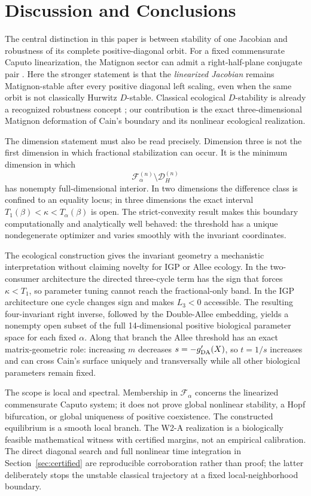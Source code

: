 \section{Discussion and Conclusions}\label{sec:discussion}

The central distinction in this paper is between stability of one Jacobian and robustness of its complete positive-diagonal orbit. For a fixed commensurate Caputo linearization, the Matignon sector can admit a right-half-plane conjugate pair \cite{Matignon1996,BrandiburGarrappaKaslik2021}. Here the stronger statement is that the \emph{linearized Jacobian} remains Matignon-stable after every positive diagonal left scaling, even when the same orbit is not classically Hurwitz \(D\)-stable. Classical ecological \(D\)-stability is already a recognized robustness concept \cite{ChenWangLiu2024}; our contribution is the exact three-dimensional Matignon deformation of Cain's boundary and its nonlinear ecological realization.

The dimension statement must also be read precisely. Dimension three is not the first dimension in which fractional stabilization can occur. It is the minimum dimension in which
\[
\mathcal F_\alpha^{(n)}\setminus\mathcal D_H^{(n)}
\]
has nonempty full-dimensional interior. In two dimensions the difference class is confined to an equality locus; in three dimensions the exact interval \(T_1(\beta)<\kappa<T_\alpha(\beta)\) is open. The strict-convexity result makes this boundary computationally and analytically well behaved: the threshold has a unique nondegenerate optimizer and varies smoothly with the invariant coordinates.

The ecological construction gives the invariant geometry a mechanistic interpretation without claiming novelty for IGP or Allee ecology. In the two-consumer architecture the directed three-cycle term has the sign that forces \(\kappa<T_1\), so parameter tuning cannot reach the fractional-only band. In the IGP architecture one cycle changes sign and makes \(L_3<0\) accessible. The resulting four-invariant right inverse, followed by the Double-Allee embedding, yields a nonempty open subset of the full 14-dimensional positive biological parameter space for each fixed \(\alpha\). Along that branch the Allee threshold has an exact matrix-geometric role: increasing \(m\) decreases \(s=-g'_{\rm DA}(X)\), so \(t=1/s\) increases and can cross Cain's surface uniquely and transversally while all other biological parameters remain fixed.

The scope is local and spectral. Membership in \(\mathcal F_\alpha\) concerns the linearized commensurate Caputo system; it does not prove global nonlinear stability, a Hopf bifurcation, or global uniqueness of positive coexistence. The constructed equilibrium is a smooth local branch. The W2-A realization is a biologically feasible mathematical witness with certified margins, not an empirical calibration. The direct diagonal search and full nonlinear time integration in Section~\ref{sec:certified} are reproducible corroboration rather than proof; the latter deliberately stops the unstable classical trajectory at a fixed local-neighborhood boundary.

